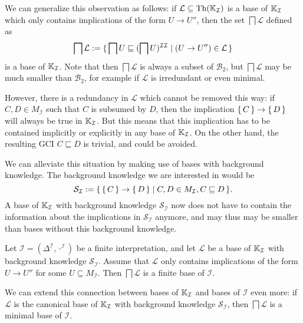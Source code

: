 We can generalize this observation as follows: if $\mathcal{L} \subseteq \operatorname{Th}({\mathbb{K}}_{\mathcal{I}})$ is a base of ${\mathbb{K}}_{\mathcal{I}}$ which only contains implications of
the form $U \to U''$, then the set $\bigsqcap \mathcal{L}$ defined as
\begin{equation*}
  \bigsqcap \mathcal{L} := {\{\, \bigsqcap U \sqsubseteq (\bigsqcap
    U)^{\mathcal{I}\mathcal{I}} \mid (U \to U'') \in \mathcal{L} \,\}}
\end{equation*}
is a base of ${\mathbb{K}}_{\mathcal{I}}$.  Note that then $\bigsqcap \mathcal{L}$ is always a
subset of $\mathcal{B}_2$, but $\bigsqcap \mathcal{L}$ may be much smaller than
$\mathcal{B}_2$, for example if $\mathcal{L}$ is irredundant or even minimal.

However, there is a redundancy in $\mathcal{L}$ which cannot be removed this way: if $C, D
\in M_{\mathcal{I}}$ such that $C$ is subsumed by $D$, then the implication ${\{\, C \,\}} \to
{\ensuremath{\{\, D \,\}}}$ will always be true in ${\mathbb{K}}_{\mathcal{I}}$.  But this means that this
implication has to be contained implicitly or explicitly in any base of ${\mathbb{K}}_{\mathcal{I}}$.  On the other hand, the resulting GCI $C \sqsubseteq D$ is trivial, and
could be avoided.

We can alleviate this situation by making use of bases with background knowledge.  The
background knowledge we are interested in would be
\begin{equation}
  \label{eq:28}
  \mathcal{S}_{\mathcal{I}} := {\{\, {\{\, C \,\}} \to {\ensuremath{\{\, D \,\}}} \mid C, D \in
    M_{\mathcal{I}}, C \sqsubseteq D \,\}}.
\end{equation}
A base of ${\mathbb{K}}_{\mathcal{I}}$ with background knowledge $\mathcal{S}_{\mathcal{I}}$ now
does not have to contain the information about the implications in
$\mathcal{S}_{\mathcal{I}}$ anymore, and may thus may be smaller than bases without this
background knowledge.

\begin{Theorem}
  \label{thm:Felix-base-B3}
  Let $\mathcal{I} = (\Delta^{\mathcal{I}}, \cdot^{\mathcal{I}})$ be a finite
  interpretation, and let $\mathcal{L}$ be a base of ${\mathbb{K}}_{\mathcal{I}}$ with
  background knowledge $\mathcal{S}_{\mathcal{I}}$.  Assume that $\mathcal{L}$ only
  contains implications of the form $U \to U''$ for some $U \subseteq M_{\mathcal{I}}$.
  Then $\bigsqcap \mathcal{L}$ is a finite base of $\mathcal{I}$.
\end{Theorem}

We can extend this connection between bases of ${\mathbb{K}}_{\mathcal{I}}$ and bases of
$\mathcal{I}$ even more: if $\mathcal{L}$ is the canonical base of ${\mathbb{K}}_{\mathcal{I}}$
with background knowledge $\mathcal{S}_{\mathcal{I}}$, then $\bigsqcap \mathcal{L}$ is a
minimal base of $\mathcal{I}$.

